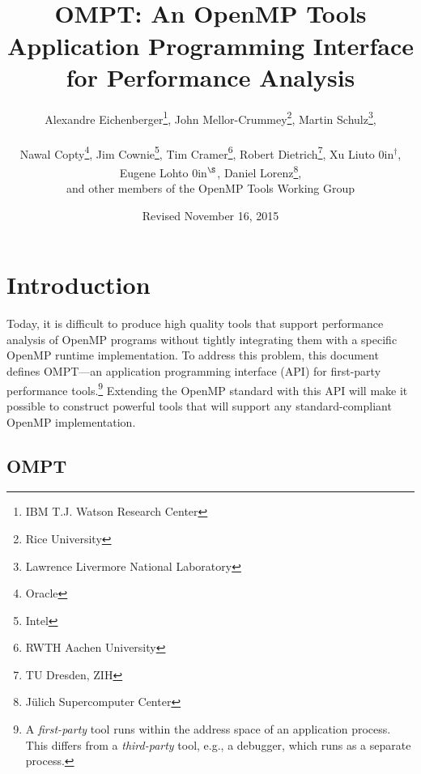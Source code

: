 \documentclass{article}
\title{OMPT: An OpenMP\textsuperscript{\textregistered} Tools Application Programming Interface for Performance Analysis}
\author{Alexandre Eichenberger\thanks{IBM T.J. Watson Research Center}, 
John Mellor-Crummey\thanks{Rice University}, 
Martin Schulz\thanks{Lawrence Livermore National Laboratory},
\\~\\
Nawal Copty\thanks{Oracle}, 
Jim Cownie\thanks{Intel},
Tim Cramer\thanks{RWTH Aachen University}, 
Robert Dietrich\thanks{TU Dresden, ZIH},
Xu Liu\hbox to 0in{$^\dagger$\hss},
Eugene Loh\hbox to 0in{$^\S$\hss}, 
Daniel Lorenz\thanks{J\"{u}lich Supercomputer Center}, 
\\
and other members of the OpenMP Tools Working Group}
\date{Revised November 16, 2015}
\begin{document}
  

                                           
\maketitle
\section{Introduction}
Today, it is difficult to produce high quality tools that support 
performance analysis of OpenMP programs without tightly integrating them with a specific OpenMP runtime implementation. To address this problem, this document defines OMPT---an application programming interface (API) for first-party performance tools.\footnote{A {\em first-party} tool runs within the address space of an application process. This differs from a {\em third-party} tool, e.g., a debugger, which runs as a separate process.}  
Extending the OpenMP standard with this API  will make it possible to construct powerful tools that will support any standard-compliant OpenMP implementation.

\subsection{OMPT}
\end{document}
